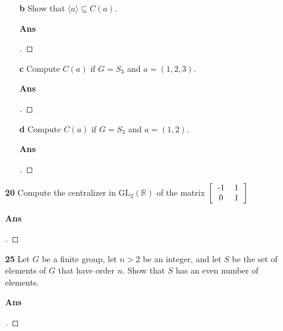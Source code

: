 \documentclass[paper=usletter, fontsize=12pt]{article}
\begin{document}
\begin{itemize}
\begin{itemize}
\begin{enumerate}
                \item[\textbf{b}] Show that $\langle a \rangle \subseteq C(a)$.
                \item[\textbf{Ans}]
                \begin{proof}[\unskip\nopunct]
                \end{proof}
                \vspace{0.2in}

                \item[\textbf{c}] Compute $C(a)$ if $G=S_3$ and $a = (1,2,3)$.
                \item[\textbf{Ans}]
                \begin{proof}[\unskip\nopunct]
                \end{proof}
                \vspace{0.2in}

                \item[\textbf{d}] Compute $C(a)$ if $G=S_3$ and $a = (1,2)$.
                \item[\textbf{Ans}]
                \begin{proof}[\unskip\nopunct]
                \end{proof}
                \vspace{0.2in}

            \end{enumerate}

            \item[\textbf{20}] Compute the centralizer in $\text{GL}_2(\mathbb{R})$ of the matrix $\left[\begin{tabular}{cc}
                                        -1 & 1 \\
                                        0 & 1
                                    \end{tabular}\right]$
            \item[\textbf{Ans}]
            \begin{proof}[\unskip\nopunct]
            \end{proof}
            \vspace{0.2in}

            \item[\textbf{25}] Let $G$ be a finite group, let $n > 2$ be an
            integer, and let $S$ be the set of elements of $G$ that have order
            $n$. Show that $S$ has an even number of elements.
            \item[\textbf{Ans}]
            \begin{proof}[\unskip\nopunct]
            \end{proof}
            \vspace{0.2in}


\end{itemize}
\end{itemize}
\end{document}
